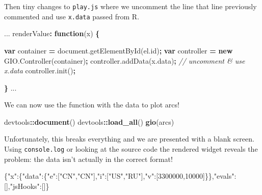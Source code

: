 \documentclass[
]{krantz}
\makeatletter
\newenvironment{Shaded}{\begin{snugshade}}{\end{snugshade}}
\newcommand{\AttributeTok}[1]{\textcolor[rgb]{0.61,0.61,0.61}{#1}}
\newcommand{\CommentTok}[1]{\textcolor[rgb]{0.37,0.37,0.37}{\textit{#1}}}
\newcommand{\DataTypeTok}[1]{\textcolor[rgb]{0.27,0.27,0.27}{#1}}
\newcommand{\DecValTok}[1]{\textcolor[rgb]{0.06,0.06,0.06}{#1}}
\newcommand{\FunctionTok}[1]{\textcolor[rgb]{0,0,0}{#1}}
\newcommand{\KeywordTok}[1]{\textcolor[rgb]{0.27,0.27,0.27}{\textbf{#1}}}
\newcommand{\NormalTok}[1]{#1}
\newcommand{\OperatorTok}[1]{\textcolor[rgb]{0.43,0.43,0.43}{\textbf{#1}}}
\newcommand{\OtherTok}[1]{\textcolor[rgb]{0.37,0.37,0.37}{#1}}
\newcommand{\StringTok}[1]{\textcolor[rgb]{0.5,0.5,0.5}{#1}}
\newcommand{\VariableTok}[1]{\textcolor[rgb]{0,0,0}{#1}}
\newenvironment{kframe}{%
\medskip{}
\setlength{\fboxsep}{.8em}
 \def\at@end@of@kframe{}%
 \ifinner\ifhmode%
  \def\at@end@of@kframe{\end{minipage}}%
  \begin{minipage}{\columnwidth}%
 \fi\fi%
 \def\FrameCommand##1{\hskip\@totalleftmargin \hskip-\fboxsep
 \colorbox{shadecolor}{##1}\hskip-\fboxsep
     \hskip-\linewidth \hskip-\@totalleftmargin \hskip\columnwidth}%
 \MakeFramed {\advance\hsize-\width
   \@totalleftmargin\z@ \linewidth\hsize
   \@setminipage}}%
 {\par\unskip\endMakeFramed%
 \at@end@of@kframe}
\renewenvironment{Shaded}{\begin{kframe}}{\end{kframe}}
\makeatother
\begin{document}
Then tiny changes to \texttt{play.js} where we uncomment the line that line previously commented and use \texttt{x.data} passed from R.

\begin{Shaded}
\begin{Highlighting}[]
\NormalTok{...}
\NormalTok{renderValue}\OperatorTok{:} \KeywordTok{function}\NormalTok{(x) }\OperatorTok{\{}

  \KeywordTok{var}\NormalTok{ container }\OperatorTok{=} \VariableTok{document}\NormalTok{.}\AttributeTok{getElementById}\NormalTok{(}\VariableTok{el}\NormalTok{.}\AttributeTok{id}\NormalTok{)}\OperatorTok{;}
  \KeywordTok{var}\NormalTok{ controller }\OperatorTok{=} \KeywordTok{new} \VariableTok{GIO}\NormalTok{.}\AttributeTok{Controller}\NormalTok{(container)}\OperatorTok{;}
  \VariableTok{controller}\NormalTok{.}\AttributeTok{addData}\NormalTok{(}\VariableTok{x}\NormalTok{.}\AttributeTok{data}\NormalTok{)}\OperatorTok{;} \CommentTok{// uncomment \& use x.data}
  \VariableTok{controller}\NormalTok{.}\AttributeTok{init}\NormalTok{()}\OperatorTok{;}

\OperatorTok{\}}
\NormalTok{...}
\end{Highlighting}
\end{Shaded}

We can now use the function with the data to plot arcs!

\begin{Shaded}
\begin{Highlighting}[]
\NormalTok{devtools}\OperatorTok{::}\KeywordTok{document}\NormalTok{()}
\NormalTok{devtools}\OperatorTok{::}\KeywordTok{load\_all}\NormalTok{()}
\KeywordTok{gio}\NormalTok{(arcs)}
\end{Highlighting}
\end{Shaded}

Unfortunately, this breaks everything and we are presented with a blank screen. Using \texttt{console.log} or looking at the source code the rendered widget reveals the problem: the data isn't actually in the correct format!

\begin{Shaded}
\begin{Highlighting}[]
\FunctionTok{\{}\DataTypeTok{"x"}\FunctionTok{:\{}\DataTypeTok{"data"}\FunctionTok{:\{}\DataTypeTok{"e"}\FunctionTok{:}\OtherTok{[}\StringTok{"CN"}\OtherTok{,}\StringTok{"CN"}\OtherTok{]}\FunctionTok{,}\DataTypeTok{"i"}\FunctionTok{:}\OtherTok{[}\StringTok{"US"}\OtherTok{,}\StringTok{"RU"}\OtherTok{]}\FunctionTok{,}\DataTypeTok{"v"}\FunctionTok{:}\OtherTok{[}\DecValTok{3300000}\OtherTok{,}\DecValTok{10000}\OtherTok{]}\FunctionTok{\}\},}\DataTypeTok{"evals"}\FunctionTok{:}\OtherTok{[]}\FunctionTok{,}\DataTypeTok{"jsHooks"}\FunctionTok{:}\OtherTok{[]}\FunctionTok{\}}
\end{Highlighting}
\end{Shaded}
\end{document}

